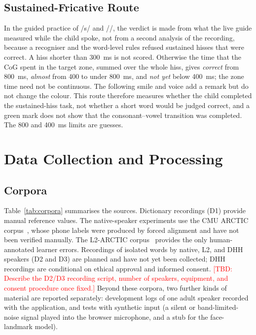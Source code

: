 \documentclass[conference]{IEEEtran}
\newcommand{\tbd}[1]{\textcolor{red}{[TBD: #1]}}
\newcommand{\ipa}[1]{/#1/}
\begin{document}
\subsection{Sustained-Fricative Route}\label{sec:held}
In the guided practice of \ipa{s} and \ipa{\textesh}, the verdict is made from what the live guide measured while the child spoke, not from a second analysis of the recording, because a recogniser and the word-level rules refused sustained hisses that were correct. A hiss shorter than 300~ms is not scored. Otherwise the time that the CoG spent in the target zone, summed over the whole hiss, gives \textit{correct} from 800~ms, \textit{almost} from 400 to under 800~ms, and \textit{not yet} below 400~ms; the zone time need not be continuous. The following smile and voice add a remark but do not change the colour. This route therefore measures whether the child completed the sustained-hiss task, not whether a short word would be judged correct, and a green mark does not show that the consonant--vowel transition was completed. The 800 and 400~ms limits are guesses.

\section{Data Collection and Processing}
\subsection{Corpora}
Table~\ref{tab:corpora} summarises the sources. Dictionary recordings (D1) provide manual reference values. The native-speaker experiments use the CMU ARCTIC corpus~\cite{kominek2004}, whose phone labels were produced by forced alignment and have not been verified manually. The L2-ARCTIC corpus~\cite{zhao2018} provides the only human-annotated learner errors. Recordings of isolated words by native, L2, and DHH speakers (D2 and D3) are planned and have not yet been collected; DHH recordings are conditional on ethical approval and informed consent. \tbd{Describe the D2/D3 recording script, number of speakers, equipment, and consent procedure once fixed.} Beyond these corpora, two further kinds of material are reported separately: development logs of one adult speaker recorded with the application, and tests with synthetic input (a silent or band-limited-noise signal played into the browser microphone, and a stub for the face-landmark model).
\end{document}
